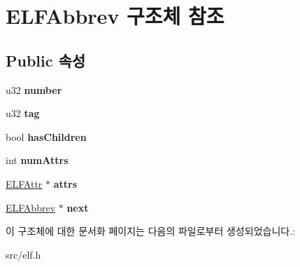 \hypertarget{struct_e_l_f_abbrev}{}\section{E\+L\+F\+Abbrev 구조체 참조}
\label{struct_e_l_f_abbrev}
\subsection*{Public 속성}
\begin{DoxyCompactItemize}
\item 
\mbox{\label{struct_e_l_f_abbrev_a6b68af30db320e5db907501097c3b329}} 
u32 {\bfseries number}
\item 
\mbox{\label{struct_e_l_f_abbrev_a0f670bcd5edab3ceab501595357d4c01}} 
u32 {\bfseries tag}
\item 
\mbox{\label{struct_e_l_f_abbrev_ad82152aad0444c5b98f5194bd0dfbc15}} 
bool {\bfseries has\+Children}
\item 
\mbox{\label{struct_e_l_f_abbrev_a5604c4d3d6d4e3beaf6cbbe7bdf8bd66}} 
int {\bfseries num\+Attrs}
\item 
\mbox{\label{struct_e_l_f_abbrev_afc84e5b441529cc88fce41021fc0839c}} 
\mbox{\hyperlink{struct_e_l_f_attr}{E\+L\+F\+Attr}} $\ast$ {\bfseries attrs}
\item 
\mbox{\label{struct_e_l_f_abbrev_a95ecd80ddef4fe77a44c0762725c06dc}} 
\mbox{\hyperlink{struct_e_l_f_abbrev}{E\+L\+F\+Abbrev}} $\ast$ {\bfseries next}
\end{DoxyCompactItemize}


이 구조체에 대한 문서화 페이지는 다음의 파일로부터 생성되었습니다.\+:\begin{DoxyCompactItemize}
\item 
src/elf.\+h\end{DoxyCompactItemize}
